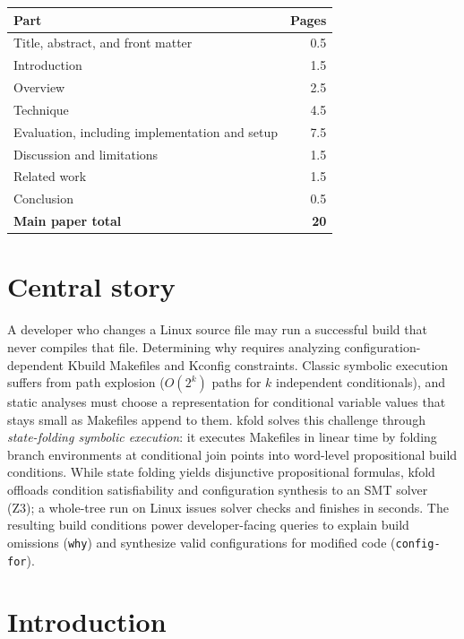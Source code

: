 \documentclass[acmsmall]{acmart}
\newcommand{\tool}{\textsf{kfold}\xspace}
\begin{document}
\begin{center}
\small
\begin{tabular}{@{}lr@{}}
\toprule
Part & Pages \\
\midrule

Title, abstract, and front matter & 0.5 \\
Introduction & 1.5 \\
Overview & 2.5 \\
Technique & 4.5 \\
Evaluation, including implementation and setup & 7.5 \\
Discussion and limitations & 1.5 \\
Related work & 1.5 \\
Conclusion & 0.5 \\
\textbf{Main paper total} & \textbf{20} \\
\bottomrule
\end{tabular}
\end{center}

\section*{Central story}\label{central-story}

A developer who changes a Linux source file may run a successful build that never compiles that file.
Determining why requires analyzing configuration-dependent Kbuild Makefiles and Kconfig constraints.
Classic symbolic execution suffers from path explosion ($O(2^k)$ paths for $k$ independent conditionals), and static analyses must choose a representation for conditional variable values that stays small as Makefiles append to them.
\tool solves this challenge through \emph{state-folding symbolic execution}: it executes Makefiles in linear time by folding branch environments at conditional join points into word-level propositional build conditions.
While state folding yields disjunctive propositional formulas, \tool offloads condition satisfiability and configuration synthesis to an SMT solver (Z3); a whole-tree run on Linux \NLinuxVersion issues \NLinuxZTchecks solver checks and finishes in \NLinuxSeconds seconds.
The resulting build conditions power developer-facing queries to explain build omissions (\texttt{why}) and synthesize valid configurations for modified code (\texttt{config-for}).

\section{Introduction}\label{sec:introduction}
\end{document}
